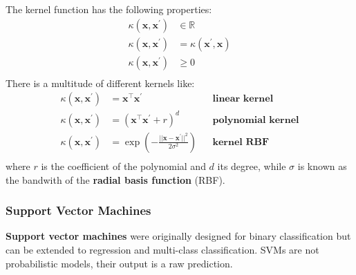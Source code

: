 \documentclass[12pt]{report}
\begin{document}
            The kernel function has the following properties:
            \begin{align}
                \kappa(\boldsymbol{x}, \boldsymbol{x^{'}}) &\in \mathbb{R} \\
                \kappa(\boldsymbol{x}, \boldsymbol{x}^{'}) &= \kappa(\boldsymbol{x}^{'}, \boldsymbol{x}) \\
                \kappa(\boldsymbol{x}, \boldsymbol{x^{'}}) &\geq 0 \\
            \end{align}
            There is a multitude of different kernels like:
            \begin{align}
                \kappa(\boldsymbol{x}, \boldsymbol{x^{'}}) &= \boldsymbol{x}^\top \boldsymbol{x}^{'} && \textbf{linear kernel} \\
                \kappa(\boldsymbol{x}, \boldsymbol{x^{'}}) &= \left(\boldsymbol{x}^\top \boldsymbol{x^{'}} + r\right)^d && \textbf{polynomial kernel} \\
                \kappa(\boldsymbol{x}, \boldsymbol{x^{'}}) &= \exp\left(-\frac{|| \boldsymbol{x} -  \boldsymbol{x^{'}} ||^2}{2\sigma^{2}}\right) && \textbf{kernel RBF} \\
            \end{align}
            where $r$ is the coefficient of the polynomial and $d$ its degree, while $\sigma$ is known as the bandwith of the \textbf{radial basis function} (RBF).
        
        \subsubsection{Support Vector Machines}
            \textbf{Support vector machines} were originally designed for binary classification but can be extended to regression and multi-class classification.
            SVMs are not probabilistic models, their output is a raw prediction.
            
\end{document}
